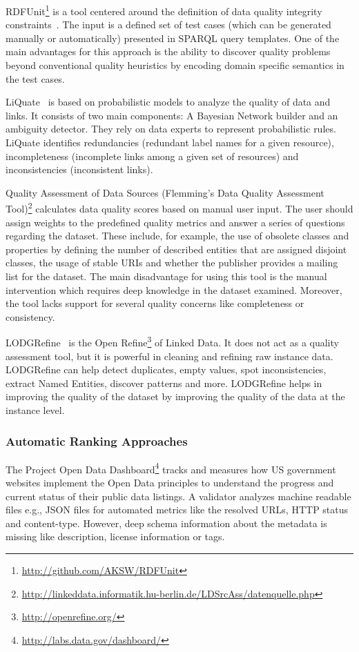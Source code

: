RDFUnit\footnote{\url{http://github.com/AKSW/RDFUnit}} is a tool centered around the definition of data quality integrity constraints~\cite{Kontokostas:WWW:14}. The input is a defined set of test cases (which can be generated manually or automatically) presented in SPARQL query templates. One of the main advantages for this approach is the ability to discover quality problems beyond conventional quality heuristics by encoding domain specific semantics in the test cases.

LiQuate~\cite{Ruckhaus:ESWC:14} is based on probabilistic models to analyze the quality of data and links. It consists of two main components: A Bayesian Network builder and an ambiguity detector. They rely on data experts to represent probabilistic rules. LiQuate identifies redundancies (redundant label names for a given resource), incompleteness (incomplete links among a given set of resources) and inconsistencies (inconsistent links).

Quality Assessment of Data Sources (Flemming's Data Quality Assessment Tool)\footnote{\url{http://linkeddata.informatik.hu-berlin.de/LDSrcAss/datenquelle.php}} calculates data quality scores based on manual user input. The user should assign weights to the predefined quality metrics and answer a series of questions regarding the dataset. These include, for example, the use of obsolete classes and properties by defining the number of described entities that are assigned disjoint classes, the usage of stable URIs and whether the publisher provides a mailing list for the dataset. The main disadvantage for using this tool is the manual intervention which requires deep knowledge in the dataset examined. Moreover, the tool lacks support for several quality concerns like completeness or consistency.

LODGRefine~\cite{Verlic:iSemantics:12} is the Open Refine\footnote{\url{http://openrefine.org/}} of Linked Data. It does not act as a quality assessment tool, but it is powerful in cleaning and refining raw instance data. LODGRefine can help detect duplicates, empty values, spot inconsistencies, extract Named Entities, discover patterns and more. LODGRefine helps in improving the quality of the dataset by improving the quality of the data at the instance level.

\subsubsection{Automatic Ranking Approaches}
The Project Open Data Dashboard\footnote{\url{http://labs.data.gov/dashboard/}} tracks and measures how US government websites implement the Open Data principles to understand the progress and current status of their public data listings. A validator analyzes machine readable files e.g., JSON files for automated metrics like the resolved URLs, HTTP status and content-type. However, deep schema information about the metadata is missing like description, license information or tags.

